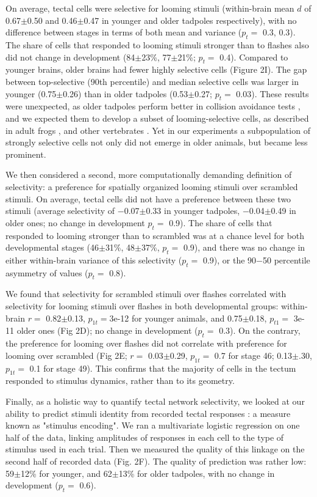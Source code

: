 \documentclass{article}
\begin{document}
On average, tectal cells were selective for looming stimuli (within-brain mean $d$ of 0.67$\pm$0.50 and 0.46$\pm$0.47 in younger and older tadpoles respectively), with no difference between stages in terms of both mean and variance ($p_t=$ 0.3, 0.3). The share of cells that responded to looming stimuli stronger than to flashes also did not change in development (84$\pm$23\%, 77$\pm$21\%; $p_t=$ 0.4). Compared to younger brains, older brains had fewer highly selective cells (Figure 2I). The gap between top-selective (90th percentile) and median selective cells was larger in younger (0.75$\pm$0.26) than in older tadpoles (0.53$\pm$0.27; $p_t=$ 0.03). These results were unexpected, as older tadpoles perform better in collision avoidance tests \citep{dong2009}, and we expected them to develop a subset of looming-selective cells, as described in adult frogs \citep{nakagawa2010otneurons,baranauskas2012}, and other vertebrates \citep{wang1992pigeon,wu2005pigeon,liu2011cat}. Yet in our experiments a subpopulation of strongly selective cells not only did not emerge in older animals, but became less prominent.

We then considered a second, more computationally demanding definition of selectivity: a preference for spatially organized looming stimuli over scrambled stimuli. On average, tectal cells did not have a preference between these two stimuli (average selectivity of $-$0.07$\pm$0.33 in younger tadpoles, $-$0.04$\pm$0.49 in older ones; no change in development $p_t=$ 0.9). The share of cells that responded to looming stronger than to scrambled was at a chance level for both developmental stages (46$\pm$31\%, 48$\pm$37\%, $p_t=$ 0.9), and there was no change in either within-brain variance of this selectivity ($p_t=$ 0.9), or the 90$-$50 percentile asymmetry of values ($p_t=$ 0.8).

We found that selectivity for scrambled stimuli over flashes correlated with selectivity for looming stimuli over flashes in both developmental groups: within-brain $r=$ 0.82$\pm$0.13, $p_{1t}=$3e-12 for younger animals, and 0.75$\pm$0.18, $p_{t1}=$ 3e-11 older ones (Fig 2D); no change in development ($p_t=$ 0.3). On the contrary, the preference for looming over flashes did not correlate with preference for looming over scrambled (Fig 2E; $r=$ 0.03$\pm$0.29, $p_{1t}=$ 0.7 for stage 46; 0.13$\pm$.30, $p_{1t}=$ 0.1 for stage 49). This confirms that the majority of cells in the tectum responded to stimulus dynamics, rather than to its geometry.

Finally, as a holistic way to quantify tectal network selectivity, we looked at our ability to predict stimuli identity from recorded tectal responses \citep{avitan2016limitations}: a measure known as "stimulus encoding". We ran a multivariate logistic regression on one half of the data, linking amplitudes of responses in each cell to the type of stimulus used in each trial. Then we measured the quality of this linkage on the second half of recorded data (Fig. 2F). The quality of prediction was rather low: 59$\pm$12\% for younger, and 62$\pm$13\% for older tadpoles, with no change in development ($p_t=$ 0.6).
\end{document}
